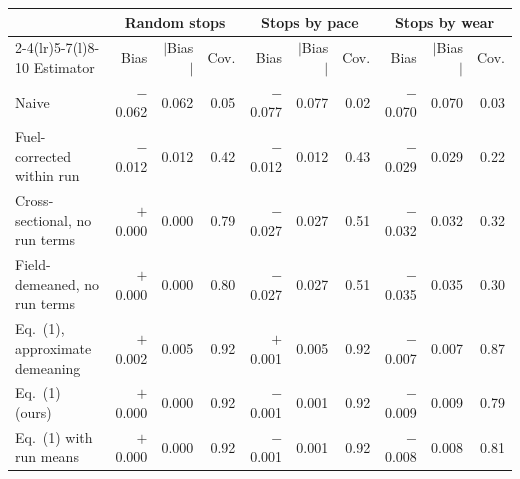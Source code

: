 \begin{tabular}{@{}lrrrrrrrrr@{}}
\toprule
\multicolumn{1}{l}{} & \multicolumn{3}{c}{Random stops} & \multicolumn{3}{c}{Stops by pace} & \multicolumn{3}{c}{Stops by wear} \\
\cmidrule(lr){2-4}\cmidrule(lr){5-7}\cmidrule(l){8-10}
Estimator & Bias & $|$Bias$|$ & Cov. & Bias & $|$Bias$|$ & Cov. & Bias & $|$Bias$|$ & Cov. \\
\midrule
Naive & \ensuremath{-}0.062 & 0.062 & 0.05 & \ensuremath{-}0.077 & 0.077 & 0.02 & \ensuremath{-}0.070 & 0.070 & 0.03 \\
Fuel-corrected within run & \ensuremath{-}0.012 & 0.012 & 0.42 & \ensuremath{-}0.012 & 0.012 & 0.43 & \ensuremath{-}0.029 & 0.029 & 0.22 \\
Cross-sectional, no run terms & \ensuremath{+}0.000 & 0.000 & 0.79 & \ensuremath{-}0.027 & 0.027 & 0.51 & \ensuremath{-}0.032 & 0.032 & 0.32 \\
Field-demeaned, no run terms & \ensuremath{+}0.000 & 0.000 & 0.80 & \ensuremath{-}0.027 & 0.027 & 0.51 & \ensuremath{-}0.035 & 0.035 & 0.30 \\
Eq.~(1), approximate demeaning & \ensuremath{+}0.002 & 0.005 & 0.92 & \ensuremath{+}0.001 & 0.005 & 0.92 & \ensuremath{-}0.007 & 0.007 & 0.87 \\
Eq.~(1) (ours) & \ensuremath{+}0.000 & 0.000 & 0.92 & \ensuremath{-}0.001 & 0.001 & 0.92 & \ensuremath{-}0.009 & 0.009 & 0.79 \\
Eq.~(1) with run means & \ensuremath{+}0.000 & 0.000 & 0.92 & \ensuremath{-}0.001 & 0.001 & 0.92 & \ensuremath{-}0.008 & 0.008 & 0.81 \\
\bottomrule
\end{tabular}

